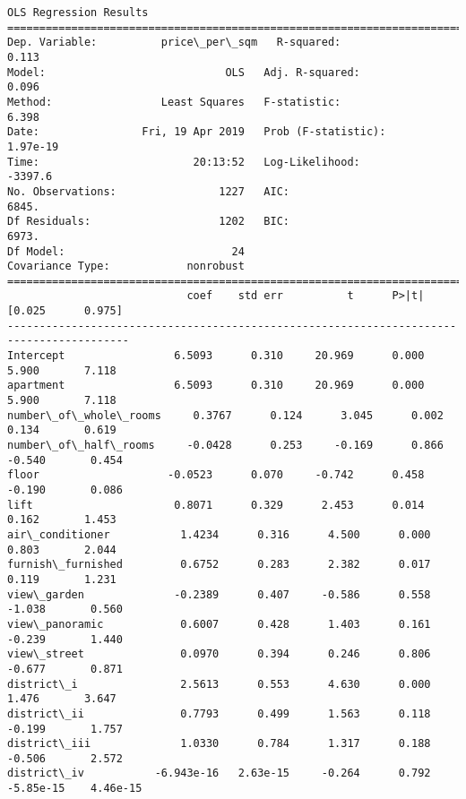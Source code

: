 \documentclass[11pt]{article}
\begin{document}
    \begin{Verbatim}[commandchars=\\\{\}]
                            OLS Regression Results                            
==============================================================================
Dep. Variable:          price\_per\_sqm   R-squared:                       0.113
Model:                            OLS   Adj. R-squared:                  0.096
Method:                 Least Squares   F-statistic:                     6.398
Date:                Fri, 19 Apr 2019   Prob (F-statistic):           1.97e-19
Time:                        20:13:52   Log-Likelihood:                -3397.6
No. Observations:                1227   AIC:                             6845.
Df Residuals:                    1202   BIC:                             6973.
Df Model:                          24                                         
Covariance Type:            nonrobust                                         
=========================================================================================
                            coef    std err          t      P>|t|      [0.025      0.975]
-----------------------------------------------------------------------------------------
Intercept                 6.5093      0.310     20.969      0.000       5.900       7.118
apartment                 6.5093      0.310     20.969      0.000       5.900       7.118
number\_of\_whole\_rooms     0.3767      0.124      3.045      0.002       0.134       0.619
number\_of\_half\_rooms     -0.0428      0.253     -0.169      0.866      -0.540       0.454
floor                    -0.0523      0.070     -0.742      0.458      -0.190       0.086
lift                      0.8071      0.329      2.453      0.014       0.162       1.453
air\_conditioner           1.4234      0.316      4.500      0.000       0.803       2.044
furnish\_furnished         0.6752      0.283      2.382      0.017       0.119       1.231
view\_garden              -0.2389      0.407     -0.586      0.558      -1.038       0.560
view\_panoramic            0.6007      0.428      1.403      0.161      -0.239       1.440
view\_street               0.0970      0.394      0.246      0.806      -0.677       0.871
district\_i                2.5613      0.553      4.630      0.000       1.476       3.647
district\_ii               0.7793      0.499      1.563      0.118      -0.199       1.757
district\_iii              1.0330      0.784      1.317      0.188      -0.506       2.572
district\_iv           -6.943e-16   2.63e-15     -0.264      0.792   -5.85e-15    4.46e-15

\end{Verbatim}
\end{document}
